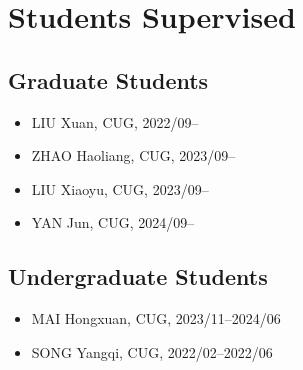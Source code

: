 \section{Students Supervised}

\subsection{Graduate Students}
\begin{itemize}
\item LIU Xuan, CUG, 2022/09--
\item ZHAO Haoliang, CUG, 2023/09--
\item LIU Xiaoyu, CUG, 2023/09--
\item YAN Jun, CUG, 2024/09--
\end{itemize}

\subsection{Undergraduate Students}
\begin{itemize}
\item MAI Hongxuan, CUG, 2023/11--2024/06
\item SONG Yangqi, CUG, 2022/02--2022/06
\end{itemize}
